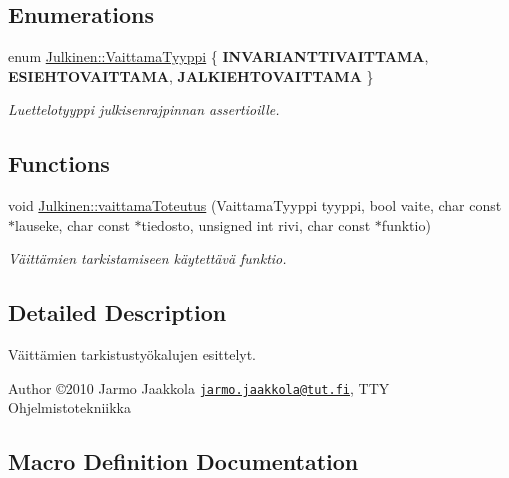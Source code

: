 \subsection*{Enumerations}
\begin{DoxyCompactItemize}
\item 
\hypertarget{namespace_julkinen_a2a2bfc4f2a56fb3f3fa143103534a14f}{}enum \hyperlink{namespace_julkinen_a2a2bfc4f2a56fb3f3fa143103534a14f}{Julkinen\+::\+Vaittama\+Tyyppi} \{ {\bfseries I\+N\+V\+A\+R\+I\+A\+N\+T\+T\+I\+V\+A\+I\+T\+T\+A\+M\+A}, 
{\bfseries E\+S\+I\+E\+H\+T\+O\+V\+A\+I\+T\+T\+A\+M\+A}, 
{\bfseries J\+A\+L\+K\+I\+E\+H\+T\+O\+V\+A\+I\+T\+T\+A\+M\+A}
 \}\label{namespace_julkinen_a2a2bfc4f2a56fb3f3fa143103534a14f}
\begin{DoxyCompactList}\small\item\em Luettelotyyppi julkisenrajpinnan assertioille. \end{DoxyCompactList}
\end{DoxyCompactItemize}
\subsection*{Functions}
\begin{DoxyCompactItemize}
\item 
void \hyperlink{namespace_julkinen_ad6f59e70f19f914c38369d67c20a0ea5}{Julkinen\+::vaittama\+Toteutus} (Vaittama\+Tyyppi tyyppi, bool vaite, char const $\ast$lauseke, char const $\ast$tiedosto, unsigned int rivi, char const $\ast$funktio)
\begin{DoxyCompactList}\small\item\em Väittämien tarkistamiseen käytettävä funktio. \end{DoxyCompactList}\end{DoxyCompactItemize}


\subsection{Detailed Description}
Väittämien tarkistustyökalujen esittelyt. 

\begin{DoxyAuthor}{Author}
©2010 Jarmo Jaakkola \href{mailto:jarmo.jaakkola@tut.fi}{\tt jarmo.\+jaakkola@tut.\+fi}, T\+T\+Y Ohjelmistotekniikka 
\end{DoxyAuthor}


\subsection{Macro Definition Documentation}
\hypertarget{vaittama_8hh_aeee94f72ed67ad120c1b012609d6aa34}{}
